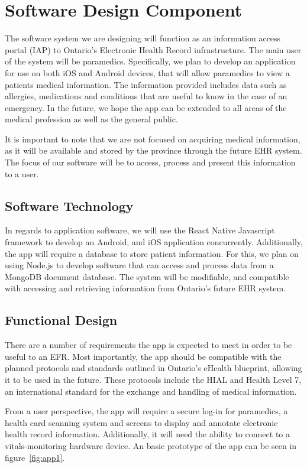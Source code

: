 
\section{Software Design Component}

The software system we are designing will function as an information access portal (IAP) to Ontario's Electronic Health Record infrastructure. The main user of the system will be paramedics. Specifically, we plan to develop an application for use on both iOS and Android devices, that will allow paramedics to view a patients medical information. The information provided includes data such as allergies, medications and conditions that are useful to know in the case of an emergency. In the future, we hope the app can be extended to all areas of the medical profession as well as the general public.

It is important to note that we are not focused on acquiring medical information, as it will be available and stored by the province through the future EHR system. The focus of our software will be to access, process and present this information to a user.

\subsection{Software Technology}
In regards to application software, we will use the React Native Javascript framework to develop an Android, and iOS application concurrently. Additionally, the app will require a database to store patient information. For this, we plan on using Node.js to develop software that can access and process data from a MongoDB document database. The system will be modifiable, and compatible with accessing and retrieving information from Ontario's future EHR system.

\subsection{Functional Design}

There are a number of requirements the app is expected to meet in order to be useful to an EFR. Most importantly, the app should be compatible with the planned protocols and standards outlined in Ontario's eHealth blueprint, allowing it to be used in the future. These protocols include the HIAL and Health Level 7, an international standard for the exchange and handling of medical information.

From a user perspective, the app will require a secure log-in for paramedics, a health card scanning system and screens to display and annotate electronic health record information. Additionally, it will need the ability to connect to a vitals-monitoring hardware device. An basic prototype of the app can be seen in figure~\ref{fig:app1}.

